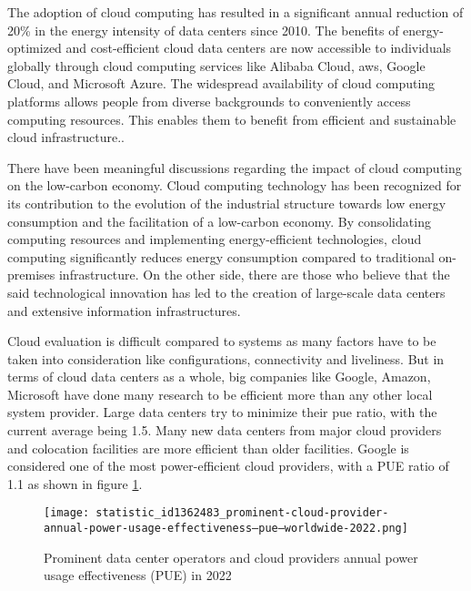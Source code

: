 \documentclass[
  a4paper,  %
  twoside,  %
  bibliography=totoc,
  headsepline,
  cleardoublepage=empty,
  parskip=half,
  draft=false
]{scrbook}
\begin{document}
The adoption of cloud computing has resulted in a significant annual reduction of 20\% in the energy intensity of data centers since 2010. The benefits of energy-optimized and cost-efficient cloud data centers are now accessible to individuals globally through cloud computing services like Alibaba Cloud, \gls{aws}, Google Cloud, and Microsoft Azure. The widespread availability of cloud computing platforms allows people from diverse backgrounds to conveniently access computing resources. This enables them to benefit from efficient and sustainable cloud infrastructure.\cite{patterson2021carbon}.

There have been meaningful discussions regarding the impact of cloud computing on the low-carbon economy\cite{tao2022can}. Cloud computing technology has been recognized for its contribution to the evolution of the industrial structure towards low energy consumption and the facilitation of a low-carbon economy. By consolidating computing resources and implementing energy-efficient technologies, cloud computing significantly reduces energy consumption compared to traditional on-premises infrastructure\cite{shahbaz2022impact}. On the other side, there are those who believe that the said technological innovation has led to the creation of large-scale data centers and extensive information infrastructures.

Cloud evaluation is difficult compared to systems as many factors have to be taken into consideration like configurations, connectivity and liveliness. But in terms of cloud data centers as a whole, big companies like Google, Amazon, Microsoft have done many research to be efficient  more than any other local system provider\cite{google-datacenters}. Large data centers try to minimize their \gls{pue} ratio, with the current average being 1.5. Many new data centers from major cloud providers and colocation facilities are more efficient than older facilities. Google is considered one of the most power-efficient cloud providers, with a PUE ratio of 1.1 as shown in figure \ref{clouds_pue_img}\cite{clouds_pue}.

\begin{figure}
	\centering
	\texttt{[image: statistic\_id1362483\_prominent-cloud-provider-annual-power-usage-effectiveness--pue--worldwide-2022.png]}
	\caption{Prominent data center operators and cloud providers annual power usage effectiveness (PUE) in 2022\cite{clouds_pue}}
	\label{clouds_pue_img}
\end{figure}
\end{document}
